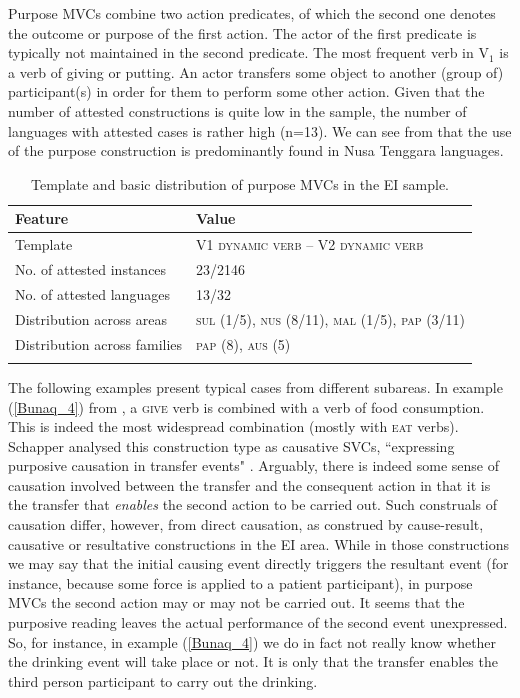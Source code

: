 Purpose MVCs combine two action predicates, of which the second one denotes the outcome or purpose of the first action. The actor of the first predicate is typically not maintained in the second predicate. The most frequent verb in V$_1$ is a verb of giving or putting. An actor transfers some object to another (group of) participant(s) in order for them to perform some other action. Given that the number of attested constructions is quite low in the sample, the number of languages with attested cases is rather high (n=13). We can see from  that the use of the purpose construction is predominantly found in Nusa Tenggara languages.

\begin{table}
\begin{tabular}{ll}
\lsptoprule
Feature&Value\tabularnewline
\midrule
Template& V1 \textsc{dynamic verb} -- V2 \textsc{dynamic verb}\tabularnewline
No. of attested instances& 23/2146 \tabularnewline
No. of attested languages& 13/32 \tabularnewline
Distribution across areas& \textsc{sul} (1/5), \textsc{nus} (8/11), \textsc{mal} (1/5), \textsc{pap} (3/11) \tabularnewline
Distribution across families& \textsc{pap} (8), \textsc{aus} (5) \tabularnewline
\lspbottomrule
\end{tabular}
\caption[Template and basic distribution of purpose MVCs]{Template and basic distribution of purpose MVCs in the EI sample.}
\label{table:purpose}
\end{table}

The following examples present typical cases from different subareas. In example (\ref{Bunaq_4}) from , a \textsc{give} verb is combined with a verb of food consumption. This is indeed the most widespread combination (mostly with \textsc{eat} verbs). Schapper analysed this construction type as causative SVCs, ``expressing purposive causation in transfer events" \citep[446]{schapper2009bunaq}. Arguably, there is indeed some sense of causation involved between the transfer and the consequent action in that it is the transfer that \emph{enables} the second action to be carried out. Such construals of causation differ, however, from direct causation, as construed by cause-result, causative or resultative constructions in the EI area. While in those constructions we may say that the initial causing event directly triggers the resultant event (for instance, because some force is applied to a patient participant), in purpose MVCs the second action may or may not be carried out. It seems that the purposive reading leaves the actual performance of the second event unexpressed. So, for instance, in example (\ref{Bunaq_4}) we do in fact not really know whether the drinking event will take place or not. It is only that the transfer enables the third person participant to carry out the drinking. 

